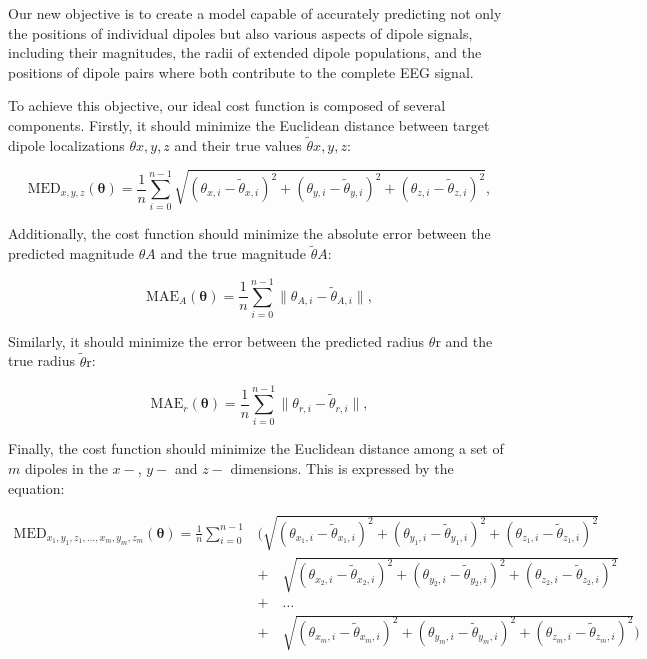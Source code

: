 \documentclass[a4paper, UKenglish, 11pt]{uiomaster}
\begin{document}
Our new objective is to create a model capable of accurately predicting not only the positions of individual dipoles but also various aspects of dipole signals, including their magnitudes, the radii of extended dipole populations, and the positions of dipole pairs where both contribute to the complete EEG signal.

To achieve this objective, our ideal cost function is composed of several components. Firstly, it should minimize the Euclidean distance between target dipole localizations ${\theta}{x,y,z}$ and their true values $\tilde{\theta}{x,y,z}$:

\begin{equation}
    \text{MED}_{x,y,z}(\boldsymbol{\theta}) = \frac{1}{n}\sum_{i=0}^{n-1}\sqrt{(\theta_{x,i} - \tilde{\theta}_{x,i})^2 + (\theta_{y,i} - \tilde{\theta}_{y,i})^2 + (\theta_{z,i} - \tilde{\theta}_{z,i})^2},
\label{eq:MED}
\end{equation}

Additionally, the cost function should minimize the absolute error between the predicted magnitude ${\theta}{A}$ and the true magnitude $\tilde{\theta}{A}$:

\begin{equation}
    \text{MAE}_{A}(\boldsymbol{\theta}) = \frac{1}{n} \sum_{i=0}^{n-1} \| \theta_{A,i} - \tilde{\theta}_{A,i} \|,
\label{eq:MAE_A}
\end{equation}

Similarly, it should minimize the error between the predicted radius ${\theta}{\text{r}}$ and the true radius $\tilde{\theta}{\text{r}}$:

\begin{equation}
    \text{MAE}_{r}(\boldsymbol{\theta}) = \frac{1}{n} \sum_{i=0}^{n-1} \| \theta_{r,i} - \tilde{\theta}_{r,i} \|,
\label{eq:MAE_r}
\end{equation}

Finally, the cost function should minimize the Euclidean distance among a set of $m$ dipoles in the $x-$, $y-$ and $z-$ dimensions. This is expressed by the equation:

\begin{equation}
\begin{aligned}
    \text{MED}_{x_1, y_1, z_1,\ldots, x_m, y_m, z_m}(\boldsymbol{\theta}) = \frac{1}{n}\sum_{i=0}^{n-1}&\Biggl( \sqrt{(\theta_{x_1,i} - \tilde{\theta}_{x_1,i})^2 + (\theta_{y_1,i} - \tilde{\theta}_{y_1,i})^2 + (\theta_{z_1,i} - \tilde{\theta}_{z_1,i})^2} \\
    & + \quad \sqrt{(\theta_{x_2,i} - \tilde{\theta}_{x_2,i})^2 + (\theta_{y_2,i} - \tilde{\theta}_{y_2,i})^2 + (\theta_{z_2,i} - \tilde{\theta}_{z_2,i})^2}
   \\ & + \quad \ldots \\
    & + \quad \sqrt{(\theta_{x_m,i} - \tilde{\theta}_{x_m,i})^2 + (\theta_{y_m,i} - \tilde{\theta}_{y_m,i})^2 + (\theta_{z_m,i} - \tilde{\theta}_{z_m,i})^2} \Biggr)
\end{aligned}
\label{eq:MED_multiple_dipoles}
\end{equation}
\end{document}
